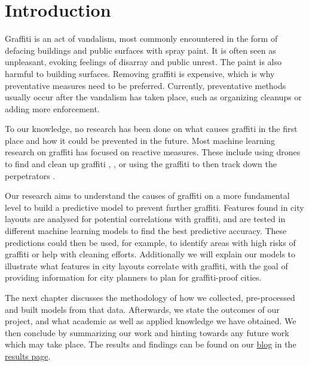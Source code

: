 \chapter{Introduction}


Graffiti is an act of vandalism, most commonly encountered in the form of defacing buildings and public surfaces with spray paint. It is often seen as unpleasant, evoking feelings of disarray and public unrest. The paint is also harmful to building surfaces. Removing graffiti is expensive, which is why preventative measures need to be preferred. Currently, preventative methods usually occur after the vandalism has taken place, such as organizing cleanups or adding more enforcement.

To our knowledge, no research has been done on what causes graffiti in the first place and how it could be prevented in the future. Most machine learning research on graffiti has focused on reactive measures. These include using drones to find and clean up graffiti \cite{uav}, \cite{drone}, or using the graffiti to then track down the perpetrators \cite{gang}.

Our research aims to understand the causes of graffiti on a more fundamental level to build a predictive model to prevent further graffiti. Features found in city layouts are analysed for potential correlations with graffiti, and are tested in different machine learning models to find the best predictive accuracy. These predictions could then be used, for example, to identify areas with high risks of graffiti or help with cleaning efforts. Additionally we will explain our models to illustrate what features in city layouts correlate with graffiti, with the goal of providing information for city planners to plan for graffiti-proof cities.

The next chapter discusses the methodology of how we collected, pre-processed and built models from that data. Afterwards, we state the outcomes of our project, and what academic as well as applied knowledge we have obtained. We then conclude by summarizing our work and hinting towards any future work which may take place. The results and findings can be found on our \href{https://cowkeyman.github.io/PredictingGraffitiUsingCityLayouts/}{blog} in the \href{https://cowkeyman.github.io/PredictingGraffitiUsingCityLayouts/results.html}{results page}.
